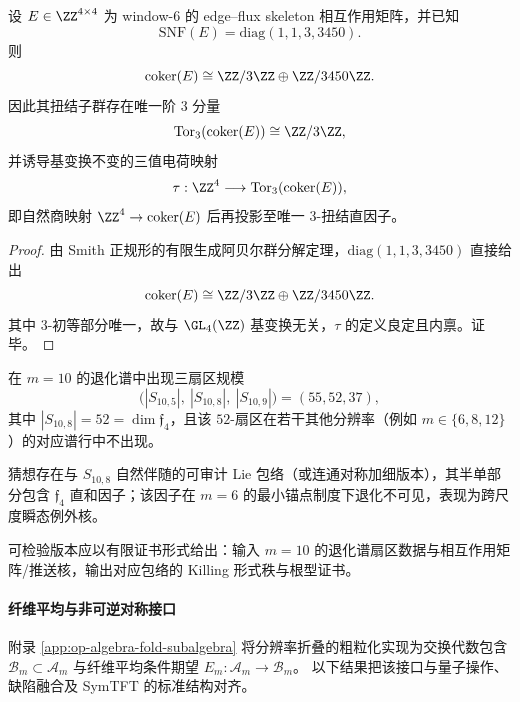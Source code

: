 \begin{proposition}\label{prop:conclusion-window6-edgeflux-z3-torsion-charge}
设 \(E\in\ZZ^{4\times4}\) 为 window-\(6\) 的 edge--flux skeleton 相互作用矩阵，并已知
\[
\mathrm{SNF}(E)=\mathrm{diag}(1,1,3,3450).
\]
则
\[
\mathrm{coker}(E)\cong \ZZ/3\ZZ\oplus \ZZ/3450\ZZ.
\]
因此其扭结子群存在唯一阶 \(3\) 分量
\[
\mathrm{Tor}_3(\mathrm{coker}(E))\cong \ZZ/3\ZZ,
\]
并诱导基变换不变的三值电荷映射
\[
\tau:\ZZ^4\longrightarrow \mathrm{Tor}_3(\mathrm{coker}(E)),
\]
即自然商映射 \(\ZZ^4\to\mathrm{coker}(E)\) 后再投影至唯一 \(3\)-扭结直因子。
\end{proposition}
\begin{proof}
由 Smith 正规形的有限生成阿贝尔群分解定理，\(\mathrm{diag}(1,1,3,3450)\) 直接给出
\[
\mathrm{coker}(E)\cong \ZZ/3\ZZ\oplus \ZZ/3450\ZZ.
\]
其中 \(3\)-初等部分唯一，故与 \(\GL_4(\ZZ)\) 基变换无关，\(\tau\) 的定义良定且内禀。证毕。
\end{proof}

\begin{conjecture}[ \(m=10\) 例外核扇区的 \(F_4\) 型瞬态紧致核]\label{conj:conclusion-m10-exceptional-kernel-f4}
在 \(m=10\) 的退化谱中出现三扇区规模
\[
\bigl(|S_{10,5}|,\ |S_{10,8}|,\ |S_{10,9}|\bigr)=(55,52,37),
\]
其中 \(|S_{10,8}|=52=\dim\mathfrak f_4\)，且该 \(52\)-扇区在若干其他分辨率（例如 \(m\in\{6,8,12\}\)）的对应谱行中不出现。

猜想存在与 \(S_{10,8}\) 自然伴随的可审计 Lie 包络（或连通对称加细版本），其半单部分包含 \(\mathfrak f_4\) 直和因子；该因子在 \(m=6\) 的最小锚点制度下退化不可见，表现为跨尺度瞬态例外核。

可检验版本应以有限证书形式给出：输入 \(m=10\) 的退化谱扇区数据与相互作用矩阵/推送核，输出对应包络的 Killing 形式秩与根型证书。
\end{conjecture}

\paragraph{纤维平均与非可逆对称接口}
附录 \ref{app:op-algebra-fold-subalgebra} 将分辨率折叠的粗粒化实现为交换代数包含 \(\mathcal{B}_m\subset \mathcal{A}_m\) 与纤维平均条件期望 \(E_m:\mathcal{A}_m\to\mathcal{B}_m\)。
以下结果把该接口与量子操作、缺陷融合及 SymTFT 的标准结构对齐。

